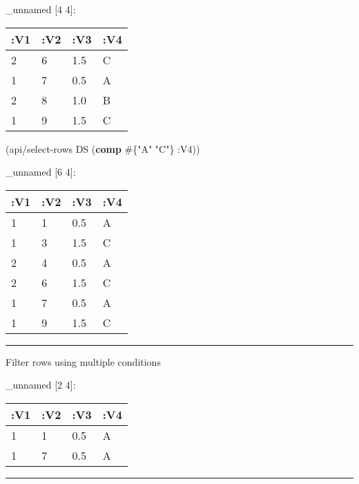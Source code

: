 \documentclass[]{article}
\newenvironment{Shaded}{\begin{snugshade}}{\end{snugshade}}
\newcommand{\AttributeTok}[1]{\textcolor[rgb]{0.77,0.63,0.00}{#1}}
\newcommand{\DecValTok}[1]{\textcolor[rgb]{0.00,0.00,0.81}{#1}}
\newcommand{\KeywordTok}[1]{\textcolor[rgb]{0.13,0.29,0.53}{\textbf{#1}}}
\newcommand{\NormalTok}[1]{#1}
\newcommand{\StringTok}[1]{\textcolor[rgb]{0.31,0.60,0.02}{#1}}
\newcommand{\VariableTok}[1]{\textcolor[rgb]{0.00,0.00,0.00}{#1}}
\begin{document}
\_unnamed {[}4 4{]}:

\begin{longtable}[]{@{}llll@{}}
\toprule
:V1 & :V2 & :V3 & :V4\tabularnewline
\midrule
\endhead
2 & 6 & 1.5 & C\tabularnewline
1 & 7 & 0.5 & A\tabularnewline
2 & 8 & 1.0 & B\tabularnewline
1 & 9 & 1.5 & C\tabularnewline
\bottomrule
\end{longtable}

\begin{Shaded}
\begin{Highlighting}[]
\NormalTok{(api/select-rows DS (}\KeywordTok{comp}\NormalTok{ #\{}\StringTok{"A"} \StringTok{"C"}\NormalTok{\} }\AttributeTok{:V4}\NormalTok{))}
\end{Highlighting}
\end{Shaded}

\_unnamed {[}6 4{]}:

\begin{longtable}[]{@{}llll@{}}
\toprule
:V1 & :V2 & :V3 & :V4\tabularnewline
\midrule
\endhead
1 & 1 & 0.5 & A\tabularnewline
1 & 3 & 1.5 & C\tabularnewline
2 & 4 & 0.5 & A\tabularnewline
2 & 6 & 1.5 & C\tabularnewline
1 & 7 & 0.5 & A\tabularnewline
1 & 9 & 1.5 & C\tabularnewline
\bottomrule
\end{longtable}

\begin{center}\rule{0.5\linewidth}{0.5pt}\end{center}

Filter rows using multiple conditions

\begin{Shaded}
\end{Shaded}

\_unnamed {[}2 4{]}:

\begin{longtable}[]{@{}llll@{}}
\toprule
:V1 & :V2 & :V3 & :V4\tabularnewline
\midrule
\endhead
1 & 1 & 0.5 & A\tabularnewline
1 & 7 & 0.5 & A\tabularnewline
\bottomrule
\end{longtable}

\begin{center}\rule{0.5\linewidth}{0.5pt}\end{center}
\end{document}
